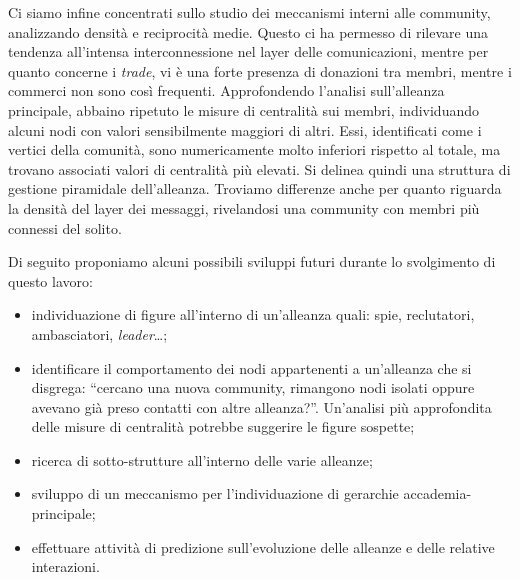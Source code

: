 Ci siamo infine concentrati sullo studio dei meccanismi interni alle community, analizzando densità e reciprocità medie. Questo ci ha permesso di rilevare una tendenza all'intensa interconnessione nel layer delle comunicazioni, mentre per quanto concerne i \textit{trade}, vi è una forte presenza di donazioni tra membri, mentre i commerci non sono così frequenti.
Approfondendo l'analisi sull'alleanza principale, abbaino ripetuto le misure di centralità sui membri, individuando alcuni nodi con valori sensibilmente maggiori di altri. Essi, identificati come i vertici della comunità, sono numericamente molto inferiori rispetto al totale, ma trovano associati valori di centralità più elevati. Si delinea quindi una struttura di gestione piramidale dell'alleanza. Troviamo differenze anche per quanto riguarda la densità del layer dei messaggi, rivelandosi una community con membri più connessi del solito.

Di seguito proponiamo alcuni possibili sviluppi futuri durante lo svolgimento di questo lavoro:
\begin{itemize}
	\item individuazione di figure all'interno di un'alleanza quali: spie, reclutatori, ambasciatori, \textit{leader}\dots;
	\item identificare il comportamento dei nodi appartenenti a un'alleanza che si disgrega: “cercano una nuova community, rimangono nodi isolati oppure avevano già preso contatti con altre alleanza?”. Un'analisi più approfondita delle misure di centralità potrebbe suggerire le figure sospette;
	\item ricerca di sotto-strutture all'interno delle varie alleanze;
	\item sviluppo di un meccanismo per l'individuazione di gerarchie accademia-principale;
	\item effettuare attività di predizione sull'evoluzione delle alleanze e delle relative interazioni.
\end{itemize}
